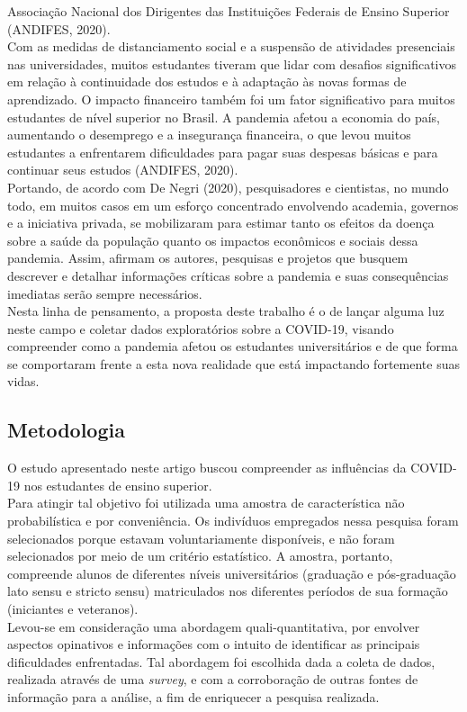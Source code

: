 \documentclass[
]{article}
\begin{document}
Associação Nacional dos Dirigentes das Instituições Federais de Ensino
Superior (ANDIFES, 2020).\\
Com as medidas de distanciamento social e a suspensão de atividades
presenciais nas universidades, muitos estudantes tiveram que lidar com
desafios significativos em relação à continuidade dos estudos e à
adaptação às novas formas de aprendizado. O impacto financeiro também
foi um fator significativo para muitos estudantes de nível superior no
Brasil. A pandemia afetou a economia do país, aumentando o desemprego e
a insegurança financeira, o que levou muitos estudantes a enfrentarem
dificuldades para pagar suas despesas básicas e para continuar seus
estudos (ANDIFES, 2020).\\
Portando, de acordo com De Negri (2020), pesquisadores e cientistas, no
mundo todo, em muitos casos em um esforço concentrado envolvendo
academia, governos e a iniciativa privada, se mobilizaram para estimar
tanto os efeitos da doença sobre a saúde da população quanto os impactos
econômicos e sociais dessa pandemia. Assim, afirmam os autores,
pesquisas e projetos que busquem descrever e detalhar informações
críticas sobre a pandemia e suas consequências imediatas serão sempre
necessários.\\
Nesta linha de pensamento, a proposta deste trabalho é o de lançar
alguma luz neste campo e coletar dados exploratórios sobre a COVID-19,
visando compreender como a pandemia afetou os estudantes universitários
e de que forma se comportaram frente a esta nova realidade que está
impactando fortemente suas vidas.

\hypertarget{metodologia}{%
\subsection{Metodologia}\label{metodologia}}

O estudo apresentado neste artigo buscou compreender as influências da
COVID-19 nos estudantes de ensino superior.\\
Para atingir tal objetivo foi utilizada uma amostra de característica
não probabilística e por conveniência. Os indivíduos empregados nessa
pesquisa foram selecionados porque estavam voluntariamente disponíveis,
e não foram selecionados por meio de um critério estatístico. A amostra,
portanto, compreende alunos de diferentes níveis universitários
(graduação e pós-graduação lato sensu e stricto sensu) matriculados nos
diferentes períodos de sua formação (iniciantes e veteranos).\\
Levou-se em consideração uma abordagem quali-quantitativa, por envolver
aspectos opinativos e informações com o intuito de identificar as
principais dificuldades enfrentadas. Tal abordagem foi escolhida dada a
coleta de dados, realizada através de uma \emph{survey}, e com a
corroboração de outras fontes de informação para a análise, a fim de
enriquecer a pesquisa realizada.
\end{document}
